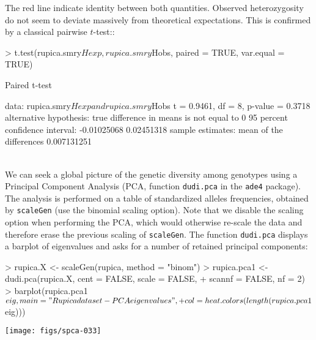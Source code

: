 \documentclass{article}
\begin{document}
\noindent The red line indicate identity between both quantities.
Observed heterozygosity do not seem to deviate massively from theoretical expectations.
This is confirmed by a classical pairwise $t$-test::
\begin{Schunk}
\begin{Sinput}
> t.test(rupica.smry$Hexp, rupica.smry$Hobs, paired = TRUE, var.equal = TRUE)
\end{Sinput}
\begin{Soutput}
	Paired t-test

data:  rupica.smry$Hexp and rupica.smry$Hobs 
t = 0.9461, df = 8, p-value = 0.3718
alternative hypothesis: true difference in means is not equal to 0 
95 percent confidence interval:
 -0.01025068  0.02451318 
sample estimates:
mean of the differences 
            0.007131251 
\end{Soutput}
\end{Schunk}
~\\

We can seek a global picture of the genetic diversity among genotypes
using a Principal Component Analysis (PCA, function \texttt{dudi.pca} in the \texttt{ade4}
package).
The analysis is performed on a table of standardized alleles
frequencies, obtained by \texttt{scaleGen} (use the binomial scaling option).
Note that we disable the scaling option when performing the PCA, which would otherwise re-scale the
data and therefore erase the previous scaling of \texttt{scaleGen}.
The function \texttt{dudi.pca} displays a barplot of
eigenvalues and asks for a number of retained principal components:
\begin{Schunk}
\begin{Sinput}
> rupica.X <- scaleGen(rupica, method = "binom")
> rupica.pca1 <- dudi.pca(rupica.X, cent = FALSE, scale = FALSE, 
+     scannf = FALSE, nf = 2)
> barplot(rupica.pca1$eig, main = "Rupica dataset - PCA eigenvalues", 
+     col = heat.colors(length(rupica.pca1$eig)))
\end{Sinput}
\end{Schunk}
\texttt{[image: figs/spca-033]}
\end{document}
